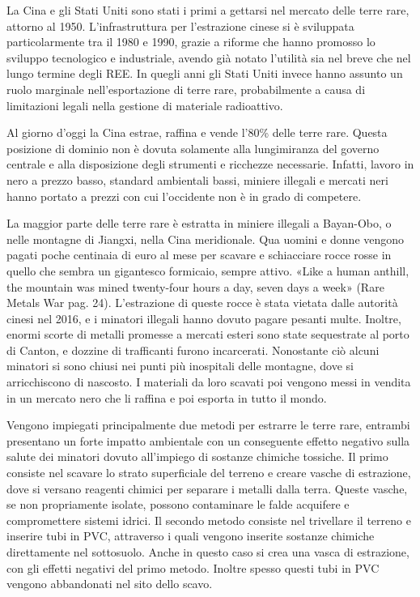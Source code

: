 \documentclass[12pt,a4paper,oneside]{book}
\begin{document}
La Cina e gli Stati Uniti sono stati i primi a gettarsi nel mercato delle terre rare, attorno al 1950. L'infrastruttura per l'estrazione cinese si è sviluppata particolarmente tra il 1980 e 1990, grazie a riforme che hanno promosso lo sviluppo tecnologico e industriale, avendo già notato l'utilità sia nel breve che nel lungo termine degli REE. In quegli anni gli Stati Uniti invece hanno assunto un ruolo marginale nell'esportazione di terre rare, probabilmente a causa di limitazioni legali nella gestione di materiale radioattivo.

Al giorno d'oggi la Cina estrae, raffina e vende l'80\% delle terre rare. Questa posizione di dominio non è dovuta solamente alla lungimiranza del governo centrale e alla disposizione degli strumenti e ricchezze necessarie. Infatti, lavoro in nero a prezzo basso, standard ambientali bassi, miniere illegali e mercati neri hanno portato a prezzi con cui l'occidente non è in grado di competere. 

La maggior parte delle terre rare è estratta in miniere illegali a Bayan-Obo, o nelle montagne di Jiangxi, nella Cina meridionale. Qua uomini e donne vengono pagati poche centinaia di euro al mese per scavare e schiacciare rocce rosse in quello che sembra un gigantesco formicaio, sempre attivo.
«Like a human anthill, the mountain was mined twenty-four hours a day, seven days a week»  (Rare Metals War pag. 24).
L'estrazione di queste rocce è stata vietata dalle autorità cinesi nel 2016, e i minatori illegali hanno dovuto pagare pesanti multe. Inoltre, enormi scorte di metalli promesse a mercati esteri sono state sequestrate al porto di Canton, e dozzine di trafficanti furono incarcerati.
Nonostante ciò alcuni minatori si sono chiusi nei punti più inospitali delle montagne, dove si arricchiscono di nascosto. I materiali da loro scavati poi vengono messi in vendita in un mercato nero che li raffina e poi esporta in tutto il mondo.

Vengono impiegati principalmente due metodi per estrarre le terre rare, entrambi presentano un forte impatto ambientale con un conseguente effetto negativo sulla salute dei minatori dovuto all'impiego di sostanze chimiche tossiche. Il primo consiste nel scavare lo strato superficiale del terreno e creare vasche di estrazione, dove si versano reagenti chimici per separare i metalli dalla terra. Queste vasche, se non propriamente isolate, possono contaminare le falde acquifere e compromettere sistemi idrici.
Il secondo metodo consiste nel trivellare il terreno e inserire tubi in PVC, attraverso i quali vengono inserite sostanze chimiche direttamente nel sottosuolo. Anche in questo caso si crea una vasca di estrazione, con gli effetti negativi del primo metodo. Inoltre spesso questi tubi in PVC vengono abbandonati nel sito dello scavo.
\end{document}
